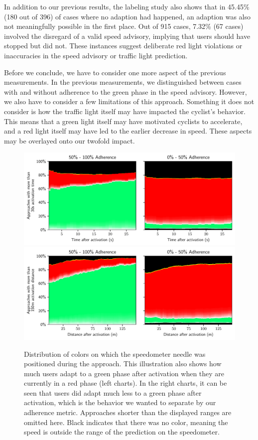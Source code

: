 In addition to our previous results, the labeling study also shows that in 45.45\% (180 out of 396) of cases where no adaption had happened, an adaption was also not meaningfully possible in the first place. Out of 915 cases, 7.32\% (67 cases) involved the disregard of a valid speed advisory, implying that users should have stopped but did not. These instances suggest deliberate red light violations or inaccuracies in the speed advisory or traffic light prediction.

Before we conclude, we have to consider one more aspect of the previous measurements. In the previous measurements, we distinguished between cases with and without adherence to the green phase in the speed advisory. However, we also have to consider a few limitations of this approach. Something it does not consider is how the traffic light itself may have impacted the cyclist's behavior. This means that a green light itself may have motivated cyclists to accelerate, and a red light itself may have led to the earlier decrease in speed. These aspects may be overlayed onto our twofold impact. 

\begin{figure}[t]
\caption{Distribution of colors on which the speedometer needle was positioned during the approach. This illustration also shows how much users adapt to a green phase after activation when they are currently in a red phase (left charts). In the right charts, it can be seen that users did adapt much less to a green phase after activation, which is the behavior we wanted to separate by our adherence metric. Approaches shorter than the displayed ranges are omitted here. Black indicates that there was no color, meaning the speed is outside the range of the prediction on the speedometer.}\label{fig:impact-adherence-discussion}
\includegraphics[width=\linewidth]{images/impacts-activation-time.pdf} 
\\
\includegraphics[width=\linewidth]{images/impacts-activation-distance.pdf}
\end{figure}

